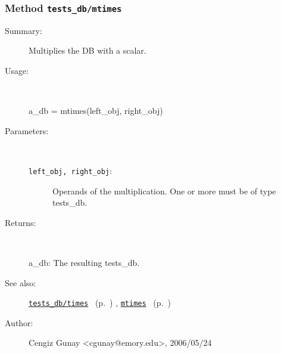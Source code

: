 \subsubsection[Method \texttt{mtimes}]{Method \texttt{tests\_db/mtimes}}%
%
\label{ref_tests_db__mtimes}%
\hypertarget{ref_tests_db__mtimes}{}%
\begin{description}
\item[Summary:]Multiplies the DB with a scalar.
%
\item[Usage:]~%
\begin{lyxcode}%
a\_db = mtimes(left\_obj, right\_obj)
%
\end{lyxcode}%
%
%
\item[Parameters:]~
\begin{description}%
\item[\texttt{left\_obj, right\_obj}:]
 Operands of the multiplication. One or more must be of type tests\_db.
\end{description}%
%
\item[Returns:
]~

	a\_db: The resulting tests\_db.
%
%
\item[See also:]%
\hyperlink{ref_tests_db__times}{\texttt{tests\_db/times}}%
\ (p.~\pageref{ref_tests_db__times})%
%
, \hyperlink{ref_mtimes}{\texttt{mtimes}}%
\ (p.~\pageref{ref_mtimes})%
%
%
\item[Author:]%
Cengiz Gunay <cgunay@emory.edu>, 2006/05/24
%
\end{description}
\methodline%
